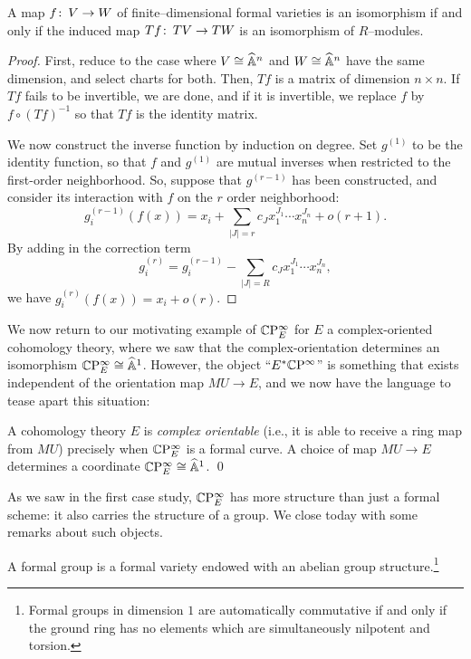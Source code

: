\begin{theorem}\label{InverseFunctionTheoremForFVars}
A map $f\colon\thinspace V \to W$ of finite--dimensional formal varieties is an isomorphism if and only if the induced map $Tf\colon\thinspace TV \to TW$ is an isomorphism of $R$--modules.
\end{theorem}
\begin{proof}
First, reduce to the case where $V \cong \widehat{\mathbb{A}}^n$ and $W \cong \widehat{\mathbb{A}}^n$ have the same dimension, and select charts for both.  Then, $Tf$ is a matrix of dimension $n \times n$.  If $Tf$ fails to be invertible, we are done, and if it is invertible, we replace $f$ by $f \circ (Tf)^{-1}$ so that $Tf$ is the identity matrix.

We now construct the inverse function by induction on degree.  Set $g^{(1)}$ to be the identity function, so that $f$ and $g^{(1)}$ are mutual inverses when restricted to the first-order neighborhood.  So, suppose that $g^{(r-1)}$ has been constructed, and consider its interaction with $f$ on the $r${\th} order neighborhood: \[g_i^{(r-1)}(f(x)) = x_i + \sum_{|J| = r} c_J x_1^{J_1} \cdots x_n^{J_n} + o(r+1). \]  By adding in the correction term \[g_i^{(r)} = g_i^{(r-1)} - \sum_{|J| = R} c_J x_1^{J_1} \cdots x_n^{J_n},\] we have $g_i^{(r)}(f(x)) = x_i + o(r)$.
\end{proof}

We now return to our motivating example of $\mathbb{C}\mathrm P^\infty_E$ for $E$ a complex-oriented cohomology theory, where we saw that the complex-orientation determines an isomorphism $\mathbb{C}\mathrm P^\infty_E \cong \widehat{\mathbb{A}}^1$.  However, the object ``$E^* \mathbb{C}\mathrm P^\infty$'' is something that exists independent of the orientation map $MU \to E$, and we now have the language to tease apart this situation:
\begin{lemma}
A cohomology theory $E$ is \textit{complex orientable} (i.e., it is able to receive a ring map from $MU$) precisely when $\mathbb{C}\mathrm P^\infty_E$ is a formal curve.  A choice of map $MU \to E$ determines a coordinate $\mathbb{C}\mathrm P^\infty_E \cong \widehat{\mathbb{A}}^1$. \qed
\end{lemma}

As we saw in the first case study, $\mathbb{C}\mathrm P^\infty_E$ has more structure than just a formal scheme: it also carries the structure of a group.  We close today with some remarks about such objects.

\begin{definition}
A formal group is a formal variety endowed with an abelian group structure.\footnote{Formal groups in dimension $1$ are automatically commutative if and only if the ground ring has no elements which are simultaneously nilpotent and torsion.}
\end{definition}

